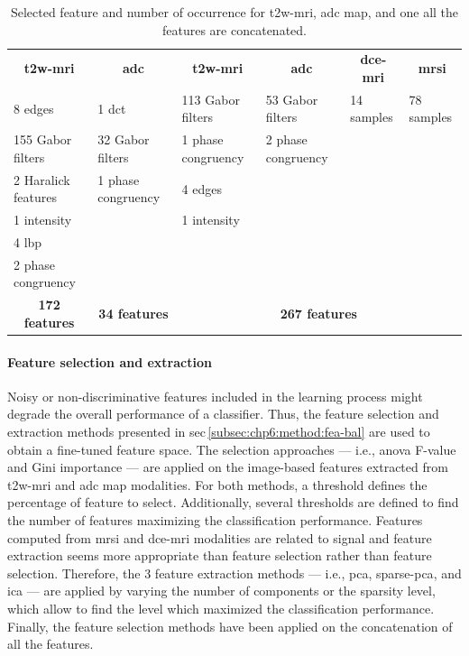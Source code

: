 \begin{landscape}
\begin{table}
  \caption{Selected feature and number of occurrence for \acs*{t2w}-\acs*{mri}, \acs*{adc} map, and one all the features are concatenated.}
  \centering
  \scriptsize
  \begin{tabular}{llllll}
    \toprule
    \multicolumn{1}{c}{\textbf{\acs*{t2w}-\acs*{mri}}} & \multicolumn{1}{c}{\textbf{\acs*{adc}}} & \multicolumn{1}{c}{\textbf{\acs*{t2w}-\acs*{mri}}} & \multicolumn{1}{c}{\textbf{\acs*{adc}}} & \multicolumn{1}{c}{\textbf{\acs*{dce}-\acs*{mri}}} & \multicolumn{1}{c}{\textbf{\acs*{mrsi}}} \\
    \cmidrule(lr){1-1} \cmidrule(lr){2-2} \cmidrule(lr){3-6}
    8 edges & 1 \acs*{dct} & 113 Gabor filters & 53 Gabor filters & 14 samples  & 78 samples \\
    155 Gabor filters & 32 Gabor filters & 1 phase congruency & 2 phase congruency & & \\ 
    2 Haralick features & 1 phase congruency & 4 edges & & & \\
    1 intensity & & 1 intensity & & & \\
    4 \acs*{lbp} & & & & & \\
    2 phase congruency & & & & & \\
    \cmidrule(lr){1-1} \cmidrule(lr){2-2} \cmidrule(lr){3-6}
    \multicolumn{1}{c}{\textbf{172 features}} & \multicolumn{1}{c}{\textbf{34 features}} & \multicolumn{4}{c}{\textbf{267 features}} \\
    \bottomrule
  \end{tabular}
  \label{tab:selfeatocc}
\end{table}

\end{landscape}

\paragraph{Feature selection and extraction}

Noisy or non-discriminative features included in the learning process might degrade the overall performance of a classifier.
Thus, the feature selection and extraction methods presented in \acs{sec}\,\ref{subsec:chp6:method:fea-bal} are used to obtain a fine-tuned feature space.
The selection approaches --- i.e., \ac{anova} F-value and Gini importance --- are applied on the image-based features extracted from \ac{t2w}-\ac{mri} and \ac{adc} map modalities.
For both methods, a threshold defines the percentage of feature to select.
Additionally, several thresholds are defined to find the number of features maximizing the classification performance.
Features computed from \ac{mrsi} and \ac{dce}-\ac{mri} modalities are related to signal and feature extraction seems more appropriate than feature selection rather than feature selection.
Therefore, the 3 feature extraction methods --- i.e., \ac{pca}, sparse-\ac{pca}, and \ac{ica} --- are applied by varying the number of components or the sparsity level, which allow to find the level which maximized the classification performance.
Finally, the feature selection methods have been applied on the concatenation of all the features.

